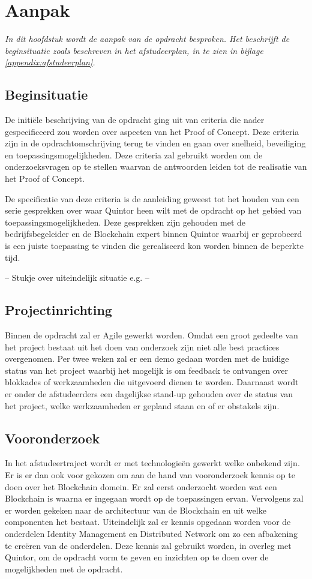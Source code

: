\chapter{Aanpak}
\label{Aanpak}

\textit{In dit hoofdstuk wordt de aanpak van de opdracht besproken. Het beschrijft de beginsituatie zoals beschreven in het afstudeerplan, in te zien in bijlage \ref{appendix:afstudeerplan}.}

\section{Beginsituatie}

De initiële beschrijving van de opdracht ging uit van criteria die nader gespecificeerd zou worden over aspecten van het Proof of Concept. Deze criteria zijn in de opdrachtomschrijving terug te vinden en gaan over snelheid, beveiliging en toepassingsmogelijkheden. Deze criteria zal gebruikt worden om de onderzoeksvragen op te stellen waarvan de antwoorden leiden tot de realisatie van het Proof of Concept.

De specificatie van deze criteria is de aanleiding geweest tot het houden van een serie gesprekken over waar Quintor heen wilt met de opdracht op het gebied van toepassingsmogelijkheden. Deze gesprekken zijn gehouden met de bedrijfsbegeleider en de Blockchain expert binnen Quintor waarbij er geprobeerd is een juiste toepassing te vinden die gerealiseerd kon worden binnen de beperkte tijd.

-- Stukje over uiteindelijk situatie e.g. --

\section{Projectinrichting}

Binnen de opdracht zal er Agile gewerkt worden. Omdat een groot gedeelte van het project bestaat uit het doen van onderzoek zijn niet alle best practices overgenomen. Per twee weken zal er een demo gedaan worden met de huidige status van het project waarbij het mogelijk is om feedback te ontvangen over blokkades of werkzaamheden die uitgevoerd dienen te worden. Daarnaast wordt er onder de afstudeerders een dagelijkse stand-up gehouden over de status van het project, welke werkzaamheden er gepland staan en of er obstakels zijn.

\section{Vooronderzoek} In het afstudeertraject wordt er met technologieën gewerkt welke onbekend zijn. Er is er dan ook voor gekozen om aan de hand van vooronderzoek kennis op te doen over het Blockchain domein. Er zal eerst onderzocht worden wat een Blockchain is waarna er ingegaan wordt op de toepassingen ervan. Vervolgens zal er worden gekeken naar de architectuur van de Blockchain en uit welke componenten het bestaat. Uiteindelijk zal er kennis opgedaan worden voor de onderdelen Identity Management en Distributed Network om zo een afbakening te creëren van de onderdelen. Deze kennis zal gebruikt worden, in overleg met Quintor, om de opdracht vorm te geven en inzichten op te doen over de mogelijkheden met de opdracht. 

